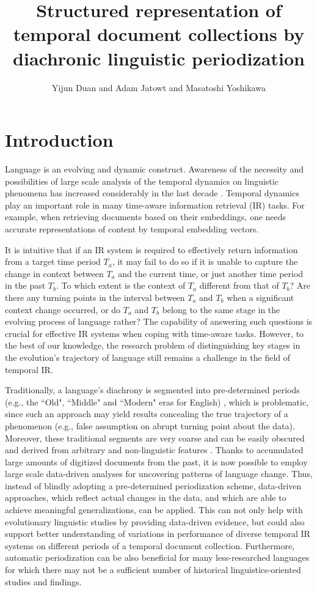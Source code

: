 \documentclass[output=paper]{langsci/langscibook}
\author{Yijun Duan\affiliation{National Institute of Advanced Industrial Science and Technology} and Adam Jatowt\affiliation{University of Innsbruck}
and  Masatoshi Yoshikawa\affiliation{Kyoto University}}
\title[Document collection representation by diachronic linguistic periodization]
      {Structured representation of temporal document collections by diachronic linguistic periodization}
\begin{document}
\maketitle


\section{Introduction}

Language is an evolving and dynamic construct. Awareness of the necessity and possibilities of large scale analysis of the temporal dynamics on linguistic phenomena has increased considerably in the last decade \citep{zhang-etal-2015-omnia, yao2018dynamic, chapters/01}.
Temporal dynamics play an important role in many time-aware information retrieval (IR) tasks. For example, when retrieving documents based on their embeddings, one needs accurate representations of content by temporal embedding vectors. 

It is intuitive that if an IR system is required to effectively return information from a target time period $T_a$, it may fail to do so if it is unable to capture the change in context between $T_a$ and the current time, or just another time period in the past $T_b$. To which extent is the context of $T_a$ different from that of $T_b$? Are there any turning points in the interval between $T_a$ and $T_b$ when a significant context change occurred, or do $T_a$ and $T_b$ belong to the same stage in the evolving process of language rather? The capability of answering such questions is crucial for effective IR systems when coping with time-aware tasks. However, to the best of our knowledge, the research problem of distinguishing key stages in the evolution's trajectory of language still remains a challenge in the field of temporal IR.

\begin{sloppypar}
Traditionally, a language's diachrony is segmented into pre-determined periods (e.g., the ``Old", ``Middle" and ``Modern" eras for English) \citep{schatzle2019diahclust}, which is problematic, since such an approach may yield results concealing the true trajectory of a phenomenon (e.g., false assumption on abrupt turning point about the data). Moreover, these traditional segments are very coarse and can be easily obscured and derived from arbitrary and non-linguistic features \citep{degaetano2018using}. 
Thanks to accumulated large amounts of digitized documents from the past, it is now possible to employ large scale data-driven analyses for uncovering patterns of language change. Thus, instead of blindly adopting a pre-determined periodization scheme, data-driven approaches, which reflect actual changes in the data, and which are able to achieve meaningful generalizations, can be applied. This can not only help with evolutionary linguistic studies by providing data-driven evidence, but could also support better understanding of variations in performance of diverse temporal IR systems on different periods of a temporal document collection. Furthermore, automatic periodization can be also beneficial for many less-researched languages for which there may not be a sufficient number of historical linguistics-oriented studies and findings.
\end{sloppypar}
\end{document}
